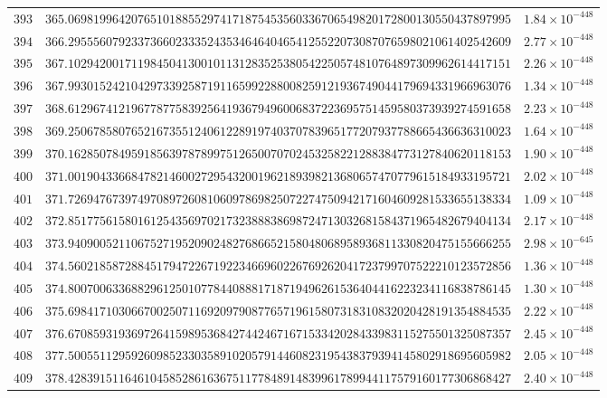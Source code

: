 \documentclass[12pt,reqno]{amsart}
\theoremstyle{remark}
\begin{document}
\begin{longtable}{clc}
$393$ & $365.0698199642076510188552974171875453560336706549820172800130550437897995$ & $1.84\times 10^{-448}$ \\
$394$ & $366.2955560792337366023335243534646404654125522073087076598021061402542609$ & $2.77\times 10^{-448}$ \\
$395$ & $367.1029420017119845041300101131283525380542250574810764897309962614417151$ & $2.26\times 10^{-448}$ \\
$396$ & $367.9930152421042973392587191165992288008259121936749044179694331966963076$ & $1.34\times 10^{-448}$ \\
$397$ & $368.6129674121967787758392564193679496006837223695751459580373939274591658$ & $2.23\times 10^{-448}$ \\
$398$ & $369.2506785807652167355124061228919740370783965177207937788665436636310023$ & $1.64\times 10^{-448}$ \\
$399$ & $370.1628507849591856397878997512650070702453258221288384773127840620118153$ & $1.90\times 10^{-448}$ \\
$400$ & $371.0019043366847821460027295432001962189398213680657470779615184933195721$ & $2.02\times 10^{-448}$ \\
$401$ & $371.7269476739749708972608106097869825072274750942171604609281533655138334$ & $1.09\times 10^{-448}$ \\
$402$ & $372.8517756158016125435697021732388838698724713032681584371965482679404134$ & $2.17\times 10^{-448}$ \\
$403$ & $373.9409005211067527195209024827686652158048068958936811330820475155666255$ & $2.98\times 10^{-645}$ \\
$404$ & $374.5602185872884517947226719223466960226769262041723799707522210123572856$ & $1.36\times 10^{-448}$ \\
$405$ & $374.8007006336882961250107784408881718719496261536404416223234116838786145$ & $1.30\times 10^{-448}$ \\
$406$ & $375.6984171030667002507116920979087765719615807318310832020428191354884535$ & $2.22\times 10^{-448}$ \\
$407$ & $376.6708593193697264159895368427442467167153342028433983115275501325087357$ & $2.45\times 10^{-448}$ \\
$408$ & $377.5005511295926098523303589102057914460823195438379394145802918695605982$ & $2.05\times 10^{-448}$ \\
$409$ & $378.4283915116461045852861636751177848914839961789944117579160177306868427$ & $2.40\times 10^{-448}$ \\

\end{longtable}
\end{document}
